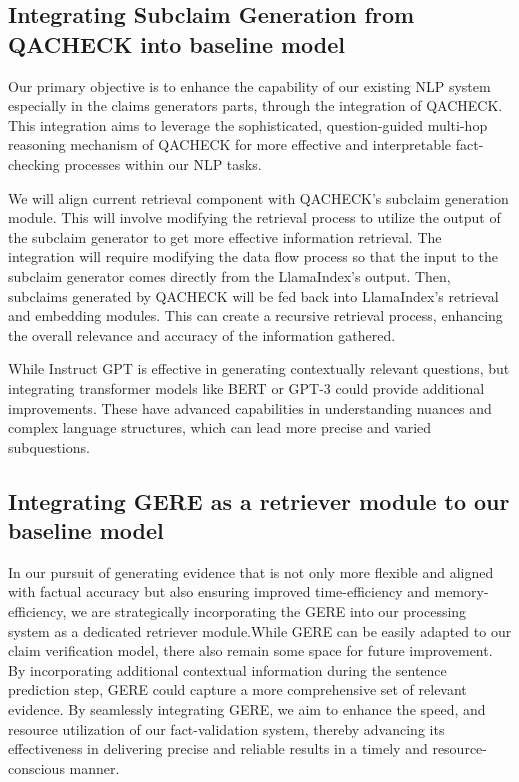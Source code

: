 \documentclass{article}
\begin{document}
\subsection{Integrating Subclaim Generation from QACHECK into baseline model}
Our primary objective is to enhance the capability of our existing NLP system especially in the claims generators parts, through the integration of QACHECK. This integration aims to leverage the sophisticated, question-guided multi-hop reasoning mechanism of QACHECK for more effective and interpretable fact-checking processes within our NLP tasks.\par
We will align current retrieval component with QACHECK’s subclaim generation module. This will involve modifying the retrieval process to utilize the output of the subclaim generator to get more effective information retrieval. The integration will require modifying the data flow process so that the input to the subclaim generator comes directly from the LlamaIndex’s output. Then, subclaims generated by QACHECK will be fed back into LlamaIndex’s retrieval and embedding modules. This can create a recursive retrieval process, enhancing the overall relevance and accuracy of the information gathered. \par
While Instruct GPT is effective in generating contextually relevant questions,  but integrating transformer models like BERT or GPT-3 could provide additional improvements. These have advanced capabilities in understanding nuances and complex language structures, which can lead more precise and varied subquestions.

\subsection{Integrating GERE as a retriever module to our baseline model}
In our pursuit of generating evidence that is not only more flexible and aligned with factual accuracy but also ensuring improved time-efficiency and memory-efficiency, we are strategically incorporating the GERE into our processing system as a dedicated retriever module.While GERE can be easily adapted to our claim verification model, there also remain some space for future improvement. By incorporating additional contextual information during the sentence prediction step, GERE could capture a more comprehensive set of relevant evidence. By seamlessly integrating GERE, we aim to enhance the speed, and resource utilization of our fact-validation system, thereby advancing its effectiveness in delivering precise and reliable results in a timely and resource-conscious manner.



\end{document}
